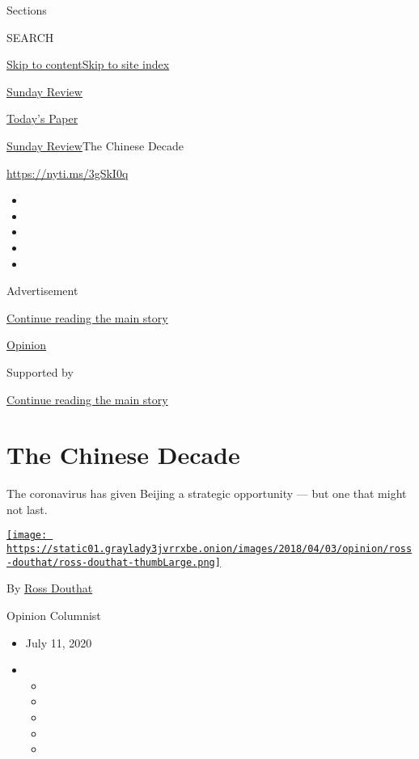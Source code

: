 Sections

SEARCH

\protect\hyperlink{site-content}{Skip to
content}\protect\hyperlink{site-index}{Skip to site index}

\href{https://www.nytimes3xbfgragh.onion/section/opinion/sunday}{Sunday
Review}

\href{https://myaccount.nytimes3xbfgragh.onion/auth/login?response_type=cookie\&client_id=vi}{}

\href{https://www.nytimes3xbfgragh.onion/section/todayspaper}{Today's
Paper}

\href{/section/opinion/sunday}{Sunday Review}\textbar{}The Chinese
Decade

\url{https://nyti.ms/3gSkI0q}

\begin{itemize}
\item
\item
\item
\item
\item
\end{itemize}

Advertisement

\protect\hyperlink{after-top}{Continue reading the main story}

\href{/section/opinion}{Opinion}

Supported by

\protect\hyperlink{after-sponsor}{Continue reading the main story}

\hypertarget{the-chinese-decade}{%
\section{The Chinese Decade}\label{the-chinese-decade}}

The coronavirus has given Beijing a strategic opportunity --- but one
that might not last.

\href{https://www.nytimes3xbfgragh.onion/by/ross-douthat}{\texttt{[image: https://static01.graylady3jvrrxbe.onion/images/2018/04/03/opinion/ross-douthat/ross-douthat-thumbLarge.png]}}

By \href{https://www.nytimes3xbfgragh.onion/by/ross-douthat}{Ross
Douthat}

Opinion Columnist

\begin{itemize}
\item
  July 11, 2020
\item
  \begin{itemize}
  \item
  \item
  \item
  \item
  \item
  \end{itemize}
\end{itemize}

